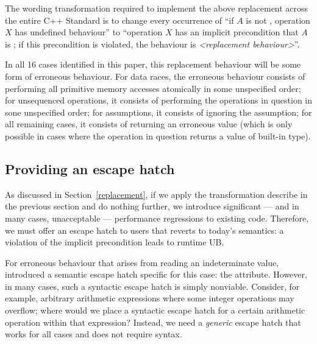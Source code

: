 {The wording transformation required to implement the above replacement across the entire C++ Standard is to change every occurrence of “if $A$ is not , operation $X$ has undefined behaviour'' to ``operation $X$ has an implicit precondition that $A$ is ; if this precondition is violated, the behaviour is \emph{<replacement behaviour>}''.

In all 16 cases identified in this paper, this replacement behaviour will be some form of erroneous behaviour. For data races, the erroneous behaviour consists of performing all primitive memory accesses atomically in some unspecified order; 
for unsequenced operations, it consists of performing the operations in question in sone unspecified order; for assumptions, it consists of ignoring the assumption; for all remaining cases, it consists of returning an erroneous value (which is only possible in cases where the operation in question returns a value of built-in type).

\subsection{Providing an escape hatch}
\label{assume}

As discussed in Section~\ref{replacement}, if we apply the transformation describe in the previous section and do nothing further, we introduce significant --- and in many cases, unacceptable --- performance regressions to existing code. Therefore, we must offer an escape hatch to users that reverts to today's semantics: a violation of the implicit precondition leads to runtime UB.

For erroneous behaviour that arises from reading an indeterminate value, \cite{P2795R5} introduced a semantic escape hatch specific for this case: the \tcode{[[indeterminate]]} attribute. However, in many cases, such a syntactic escape hatch is simply nonviable. Consider, for example, arbitrary arithmetic expressions where some integer operations may overflow; where would we place a syntactic escape hatch for a certain arithmetic operation within that expression? Instead, we need a \emph{generic} escape hatch that works for all cases and does not require syntax.

}
